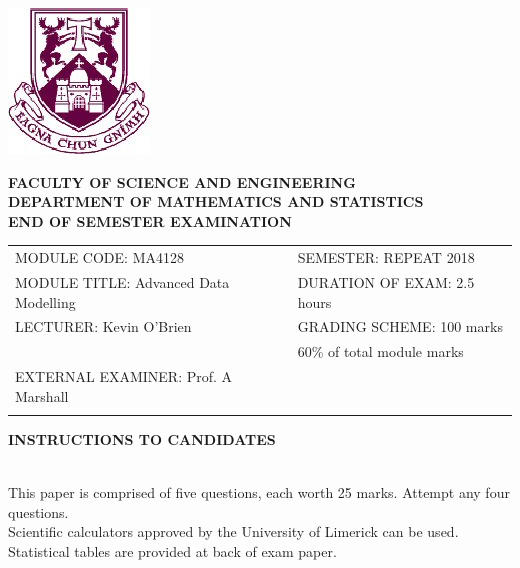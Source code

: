 \documentclass[a4paper,12pt]{article}
\begin{document}
	
	\begin{center}
		\includegraphics[scale=0.60]{shieldtransparent2}
	\end{center}
	
	\begin{center}
		\vspace{1cm}
		\large \bf {FACULTY OF SCIENCE AND ENGINEERING} \\[0.5cm]
		\normalsize DEPARTMENT OF MATHEMATICS AND STATISTICS \\[1.25cm]
		\large \bf {END OF SEMESTER EXAMINATION} \\[1.5cm]
	\end{center}
	
	\begin{tabular}{ll}
		MODULE CODE: MA4128 & SEMESTER: REPEAT 2018\\[1cm]
		MODULE TITLE: Advanced Data Modelling & DURATION OF EXAM: 2.5 hours \\[1cm]
		LECTURER: Kevin O'Brien & GRADING SCHEME: 100 marks\\
		& \phantom{GRADING SCHEME:} \footnotesize {60\% of total module marks}   \\[0.8cm]
		EXTERNAL EXAMINER: Prof. A Marshall & \\[1cm]
		\\[1cm]
	\end{tabular}
	\begin{center}
		{\bf INSTRUCTIONS TO CANDIDATES}
	\end{center}
	
	{\noindent \\ This paper is comprised of five questions, each worth 25 marks. Attempt any four questions.
		\\ Scientific calculators approved by the University of Limerick can be used. 
		\\ Statistical tables are provided at back of exam paper.
	}
	\normalsize
	\newpage

\end{document}
